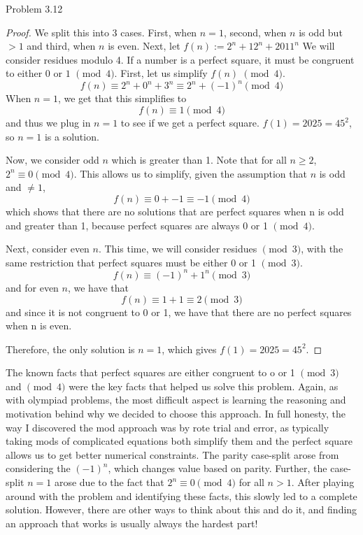 \begin{sol}{Problem 3.12}
\begin{proof}
We split this into 3 cases. First, when $n = 1$, second, when $n$  is odd but $> 1$ and third, when $n$ is even. Next, let $f(n) := 2^n + 12^n + 2011^n$
We will consider residues modulo 4. If a number is a perfect square, it must be congruent to either $0$ or $1$ $\pmod{4}$. First, let us simplify $f(n)$ $\pmod{4}$. 
\[
f(n) \equiv 2^n + 0^n + 3^n \equiv 2^n + (-1)^n\pmod{4}
\]
When $n = 1$, we get that this simplifies to 
\[
f(n) \equiv 1 \pmod{4}
\]
and thus we plug in $n=1$ to see if we get a perfect square. $f(1) = 2025 = 45^2$, so $n=1$ is a solution. 

Now, we consider odd $n$ which is greater than 1. Note that for all $n \geq 2$, $2^n \equiv 0 \pmod{4}$. This allows us to simplify, given the assumption that $n$ is odd and $\neq 1$,
\[
f(n) \equiv 0 + -1 \equiv -1 \pmod{4}
\]
which shows that there are no solutions that are perfect squares when n is odd and greater than 1, because perfect squares are always 0 or 1 $\pmod{4}$. 

Next, consider even $n$. This time, we will consider residues $\pmod{3}$, with the same restriction that perfect squares must be either $0$ or 1 $\pmod{3}$.
\[
f(n) \equiv (-1)^n + 1^n \pmod{3}
\]
and for even $n$, we have that
\[
f(n) \equiv 1 + 1 \equiv 2 \pmod{3}
\]
and since it is not congruent to 0 or 1, we have that there are no perfect squares when n is even.

Therefore, the only solution is $\boxed{n=1}$, which gives $f(1) = 2025 = 45^2$.
\end{proof}

The known facts that perfect squares are either congruent to o or 1 $\pmod{3}$ and $\pmod{4}$ were the key facts that helped us solve this problem. Again, as with olympiad problems, the most difficult aspect is learning the reasoning and motivation behind why we decided to choose this approach. In full honesty, the way I discovered the mod approach was by rote trial and error, as typically taking mods of complicated equations both simplify them and the perfect square allows us to get better numerical constraints. The parity case-split arose from considering the $(-1)^n$, which changes value based on parity. Further, the case-split $n=1$ arose due to the fact that $2^n \equiv 0 \pmod{4}$ for all $n > 1$. After playing around with the problem and identifying these facts, this slowly led to a complete solution. However, there are other ways to think about this and do it, and finding an approach that works is usually always the hardest part!
\end{sol}